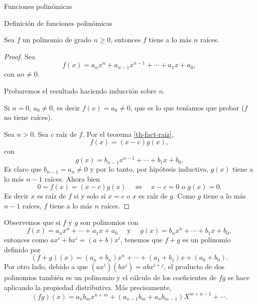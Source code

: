 \begin{chapter}{Funciones polinómicas}
\begin{section}{Definición de funciones polinómicas}
        \begin{teorema}\label{th-pol-raiz}
            Sea $f$ un polinomio de grado $n \ge 0$, entonces $f$ tiene a lo  más  $n$ raíces. 
        \end{teorema}
        \begin{proof} 
            Sea  
            \begin{equation*}
            f(x) = a_nx^n + a_{n-1}x^{n-1}+\cdots + a_1x +a_0,
            \end{equation*}
            con $an \ne 0$.

            Probaremos el resultado haciendo inducción sobre $n$. 
            
            Si $n=0$, $a_0 \ne 0$, es decir  $f(x)=a_0\ne 0$, que es lo que teníamos que probar ($f$ no tiene raíces). 
            
            
            Sea $n>0$. Sea $c$ raíz de $f$. Por  el teorema \ref{th-fact-raiz},  
            \begin{equation*}
            f(x) = (x-c)g(x),
            \end{equation*}
            con 
            \begin{equation*}
            g(x) = b_{n-1}x^{n-1} + \cdots + b_1x +b_0.
            \end{equation*}
            Es claro que $b_{n-1} = a_n \ne 0$ y por lo tanto, por hipótesis inductiva, $g(x)$ tiene a lo más $n-1$ raíces. Ahora bien 
            \begin{equation*}
                0 =f(x) = (x-c)g(x) \quad \Leftrightarrow \quad x-c=0 \text{ o } g(x) =0.
            \end{equation*} 
            Es decir $x$ es raíz de $f$ si y solo si $x=c$ o $x$ es raíz de $g$. Como $g$ tiene a lo más $n-1$ raíces,  $f$ tiene a lo más $n$ raíces.
        \end{proof}

        Observemos que si $f$ y $g$ son polinomios con   
        \begin{equation*}
            f(x) = a_nx^n + \cdots + a_1x +a_0 \quad\text{ y } \quad g(x) = b_nx^n +\cdots + b_1x +b_0,
        \end{equation*}
        entonces como $ax^i + b x^i = (a+b)x^i$, tenemos que $f+g$ es un polinomio definido por 
        \begin{equation*}
            (f + g)(x) = (a_n+b_n)x^n + \cdots + (a_1+b_1)x +(a_0+b_0).
        \end{equation*}
        Por otro  lado,  debido  a que $(ax^i)(bx^j) = abx^{i+j}$, el producto de dos polinomios también es un polinomio y el cálculo de los coeficientes de $fg$  se hace aplicando la propiedad distributiva. Más precisamente,
        \begin{equation*}
            (fg)(x) = a_nb_m x^{n+m} + (a_{n-1}b_m + a_nb_{m-1})X^{m+n-1} + \cdots. 
        \end{equation*}
        

\end{section}
\end{chapter}
